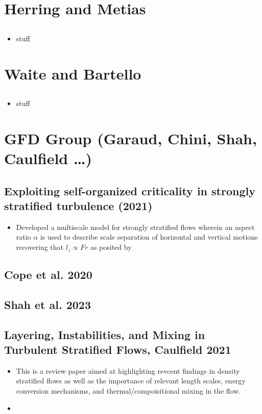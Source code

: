 \documentclass{article}
\begin{document}
\section{Herring and Metias}
    \subsection{}
    \begin{itemize}
        \item stuff
    \end{itemize}

\section{Waite and Bartello}
    \subsection{}
    \begin{itemize}
        \item stuff
    \end{itemize}


\section{GFD Group (Garaud, Chini, Shah, Caulfield \ldots)}
    \subsection{Exploiting self-organized criticality in strongly stratified
    turbulence (2021)}
    \begin{itemize}
        \item Developed a multiscale model for strongly stratified flows wherein an
        aspect ratio $\alpha$ is used to describe scale separation of horizontal and
        vertical motions recovering that $l_z \propto Fr$ as posited by
    \end{itemize}

    \subsection{Cope et al. 2020}

    \subsection{Shah et al. 2023}

    \subsection{Layering, Instabilities, and Mixing in Turbulent Stratified
    Flows, Caulfield 2021}
    \begin{itemize}
        \item This is a review paper aimed at highlighting revcent findings in
        density stratified flows as well as the importance of relevant
        length scales, energy conversion mechanisms, and thermal/compoisitional
        mixing in the flow. 
        \item 
    \end{itemize}
\end{document}
